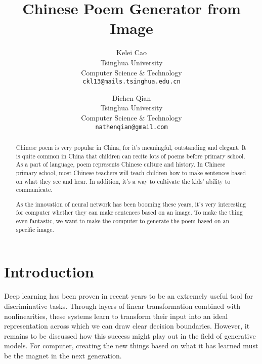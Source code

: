 \documentclass[10pt,twocolumn,letterpaper]{article}
\begin{document}
\title{ Chinese Poem Generator from Image}

\author{Kelei Cao\\
Tsinghua University \\
Computer Science \& Technology\\
{\tt\small ckl13@mails.tsinghua.edu.cn}
\and
Dichen Qian\\
Tsinghua University \\
Computer Science \& Technology\\
{\tt\small nathenqian@gmail.com}
}

\maketitle

\begin{abstract}
   	Chinese poem is very popular in China, for it's meaningful, outstanding and elegant. It is quite common in China that children can recite lots of poems before primary school. As a part of language, poem represents Chinese culture and history. 
	In Chinese primary school, most Chinese teachers will teach children how to make sentences based on what they see and hear. In addition, it's a way to cultivate the kids' ability to communicate.

	As the innovation of neural network has been booming these years, it's very interesting for computer whether they can make sentences based on an image. To make the thing even fantastic, we want to make the computer to generate the poem based on an specific image.
	
\end{abstract}

\section{Introduction}
Deep learning has been proven in recent years to be an extremely useful tool for discriminative tasks. Through layers of linear transformation combined with nonlinearities, these systems learn to transform their input into an ideal representation across which we can draw clear decision boundaries. However, it remains to be discussed how this success might play out in the field of generative models. For computer, creating the new things based on what it has learned must be the magnet in the next generation.
\end{document}
